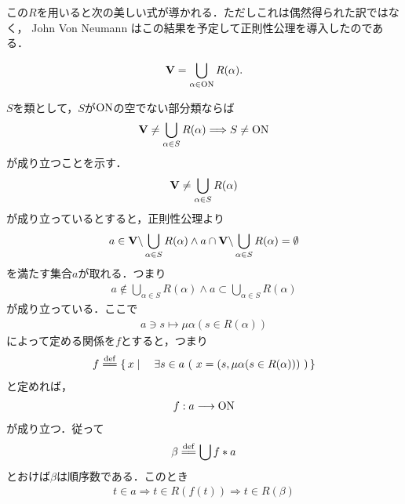	この$R$を用いると次の美しい式が導かれる．ただしこれは偶然得られた訳ではなく，
	John Von Neumann はこの結果を予定して正則性公理を導入したのである．
	
	\begin{screen}
		\begin{thm}[すべての集合は整礎的である]\label{thm:every_set_is_well_founded}
			\begin{align}
				\mathbf{V} = \bigcup_{\alpha \in \mathrm{ON}} R(\alpha).
			\end{align}
		\end{thm}
	\end{screen}
	
	\begin{prf}
		$S$を類として，$S$が$\mathrm{ON}$の空でない部分類ならば
		\begin{align}
			\mathbf{V} \neq \bigcup_{\alpha \in S} R(\alpha)
			\Longrightarrow S \neq \mathrm{ON}
		\end{align}
		が成り立つことを示す．
		\begin{align}
			\mathbf{V} \neq \bigcup_{\alpha \in S} R(\alpha)
		\end{align}
		が成り立っているとすると，正則性公理より
		\begin{align}
			a \in \mathbf{V} \backslash \bigcup_{\alpha \in S} R(\alpha)
			\wedge a \cap \mathbf{V} \backslash \bigcup_{\alpha \in S} R(\alpha) = \emptyset
		\end{align}
		を満たす集合$a$が取れる．つまり
		\begin{align}
			a \notin \bigcup_{\alpha \in S} R(\alpha) \wedge a \subset \bigcup_{\alpha \in S} R(\alpha)
		\end{align}
		が成り立っている．ここで
		\begin{align}
			a \ni s \longmapsto \mu \alpha (s \in R(\alpha))
		\end{align}
		によって定める関係を$f$とすると，つまり
		\begin{align}
			f \defeq \Set{x}{\exists s \in a\ (\ x = (s,\mu \alpha (s \in R(\alpha)))\ )}
		\end{align}
		と定めれば，
		\begin{align}
			f:a \longrightarrow \mathrm{ON}
		\end{align}
		が成り立つ．従って
		\begin{align}
			\beta \defeq \bigcup f \ast a
		\end{align}
		とおけば$\beta$は順序数である．このとき
		\begin{align}
			t \in a \Longrightarrow t \in R(f(t)) \Longrightarrow t \in R(\beta)
		\end{align}

\end{prf}
